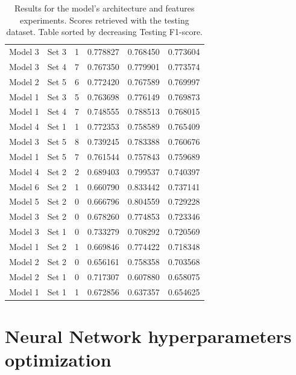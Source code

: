 \begin{table}[htbp]
\begin{tabular}{c|c|c|c|c|c}
        Model 3  &	Set 3      &	1	    &	0.778827    &	0.768450    &	0.773604    \\
        Model 3  &	Set 4      &	7	    &	0.767350    &	0.779901    &	0.773574    \\
        Model 2  &	Set 5      &	6	    &	0.772420    &	0.767589    &	0.769997    \\
        Model 1  &	Set 3      &	5	    &	0.763698    &	0.776149    &	0.769873    \\
        Model 1  &	Set 4      &	7	    &	0.748555    &	0.788513    &	0.768015    \\
        Model 4  &	Set 1      &	1	    &	0.772353    &	0.758589    &	0.765409    \\
        Model 3  &	Set 5      &	8	    &	0.739245    &	0.783388    &	0.760676    \\
        Model 1  &	Set 5      &	7	    &	0.761544    &	0.757843    &	0.759689    \\
        Model 4  &	Set 2      &	2	    &	0.689403    &	0.799537    &	0.740397    \\
        Model 6  &	Set 2      &	1	    &	0.660790    &	0.833442    &	0.737141    \\
        Model 5  &	Set 2      &	0	    &	0.666796    &	0.804559    &	0.729228    \\
        Model 3  &	Set 2      &	0	    &	0.678260    &	0.774853    &	0.723346    \\
        Model 3  &	Set 1      &	0	    &	0.733279    &	0.708292    &	0.720569    \\
        Model 1  &	Set 2      &	1	    &	0.669846    &	0.774422    &	0.718348    \\
        Model 2  &	Set 2      &	0	    &	0.656161    &	0.758358    &	0.703568    \\
        Model 2  &	Set 1      &	0	    &	0.717307    &	0.607880    &	0.658075    \\
        Model 1  &	Set 1      &	1	    &	0.672856    &	0.637357    &	0.654625    \\
    \end{tabular}
    \caption{Results for the model's architecture and features experiments. Scores retrieved with the testing dataset. Table sorted by decreasing Testing F1-score.}
    \label{tab-annex:nn-experiments}
\end{table}




\chapter{Neural Network hyperparameters optimization}
\label{annex:nn-fine-tuning}

